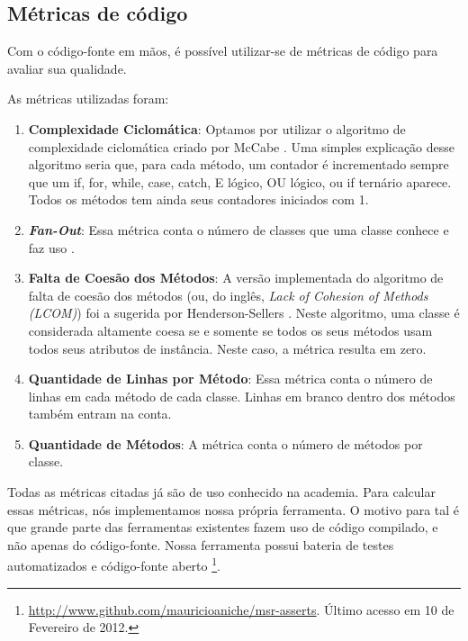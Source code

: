 \subsection{Métricas de código}

Com o código-fonte em mãos, é possível utilizar-se de métricas de código
para avaliar sua qualidade.

As métricas utilizadas foram:

\begin{enumerate}
	\item \textbf{Complexidade Ciclomática}: Optamos por utilizar o algoritmo de complexidade ciclomática criado
	por McCabe \cite{mccabe}. Uma simples explicação desse algoritmo seria que, para cada método, um contador
	é incrementado sempre que um if, for, while, case, catch, E lógico, OU lógico, ou if ternário aparece.
	Todos os métodos tem ainda seus contadores iniciados com 1. 
	
	\item \textbf{\textit{Fan-Out}}: Essa métrica conta o número de classes que uma classe conhece e faz uso \cite{lorenz}.
	
	\item \textbf{Falta de Coesão dos Métodos}: A versão implementada do algoritmo de falta de coesão dos métodos 
	(ou, do inglês, \textit{Lack of Cohesion of Methods (LCOM)}) foi a sugerida por Henderson-Sellers \cite{lcom-hs}.
	Neste algoritmo, uma classe é considerada altamente coesa se e somente se todos os seus métodos usam
	todos seus atributos de instância. Neste caso, a métrica resulta em zero. 
	
	\item \textbf{Quantidade de Linhas por Método}: Essa métrica conta o número de linhas em cada método de
	cada classe. Linhas em branco dentro dos métodos também entram na conta.
	
	\item \textbf{Quantidade de Métodos}: A métrica conta o número de métodos por classe.
	
\end{enumerate}

Todas as métricas citadas já são de uso conhecido na academia. Para calcular essas
métricas, nós implementamos nossa própria ferramenta. O motivo para tal é que
grande parte das ferramentas existentes fazem uso de código compilado, e não
apenas do código-fonte. Nossa ferramenta possui bateria de testes automatizados
e código-fonte aberto \footnote{\url{http://www.github.com/mauricioaniche/msr-asserts}. 
Último acesso em 10 de Fevereiro de 2012.}.

